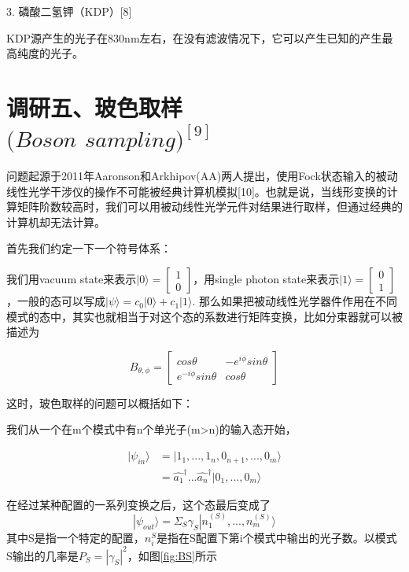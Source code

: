 3.	磷酸二氢钾（KDP）[8]

KDP源产生的光子在830nm左右，在没有滤波情况下，它可以产生已知的产生最高纯度的光子。

\section{调研五、玻色取样 \\ $(Boson$ $ sampling)^{[9]}$}

问题起源于2011年Aaronson和Arkhipov(AA)两人提出，使用Fock状态输入的被动线性光学干涉仪的操作不可能被经典计算机模拟[10]。也就是说，当线形变换的计算矩阵阶数较高时，我们可以用被动线性光学元件对结果进行取样，但通过经典的计算机却无法计算。

首先我们约定一下一个符号体系：

我们用vacuum state来表示$|0\rangle=\left[
 \begin{matrix}
   1 \\
   0
  \end{matrix}
  \right]$，用single photon state来表示$|1\rangle=\left[
 \begin{matrix}
   0 \\
   1
  \end{matrix}
  \right]$，一般的态可以写成$|\psi\rangle=c_0|0\rangle+c_1|1\rangle$. 那么如果把被动线性光学器件作用在不同模式的态中，其实也就相当于对这个态的系数进行矩阵变换，比如分束器就可以被描述为

$$
 B_{\theta,\phi}=\left[
 \begin{matrix}
   cos\theta & -e^{i\phi}sin\theta  \\
   e^{-i\phi}sin\theta & cos\theta 
  \end{matrix}
  \right]
$$

这时，玻色取样的问题可以概括如下：

我们从一个在m个模式中有n个单光子(m>n)的输入态开始，

\begin{align*}
|\psi_{in}\rangle
&=|1_1,...,1_n,0_{n+1},...,0_m\rangle\\
&=\hat{a_1}^\dagger...\hat{a_n}^\dagger|0_1,...,0_m\rangle
\end{align*}

在经过某种配置的一系列变换之后，这个态最后变成了\[|\psi_{out}\rangle=\Sigma_S\gamma_S|n_1^{(S)},...,n_m^{(S)}\rangle\]
其中S是指一个特定的配置，$n_{i}^{S}$是指在S配置下第i个模式中输出的光子数。以模式S输出的几率是$P_S=|\gamma_S|^2$，如图\ref{fig:BS}所示

